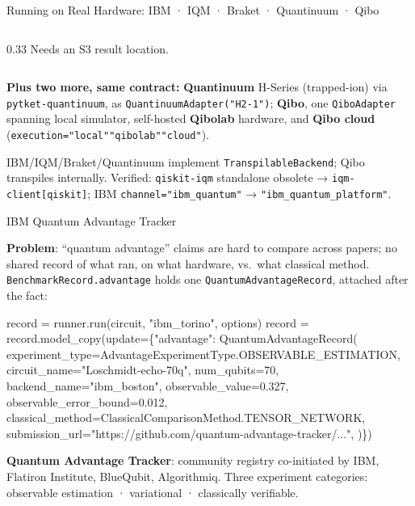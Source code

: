 \documentclass[
  ignorenonframetext,
  aspectratio=169,
]{beamer}
\newenvironment{Shaded}{\begin{snugshade}}{\end{snugshade}}
\newcommand{\DecValTok}[1]{\textcolor[rgb]{0.96,0.45,0.00}{#1}}
\newcommand{\FloatTok}[1]{\textcolor[rgb]{0.96,0.45,0.00}{#1}}
\newcommand{\NormalTok}[1]{\textcolor[rgb]{0.81,0.81,0.76}{#1}}
\newcommand{\OperatorTok}[1]{\textcolor[rgb]{0.81,0.81,0.76}{#1}}
\newcommand{\StringTok}[1]{\textcolor[rgb]{0.96,0.31,0.31}{#1}}
\begin{document}
\begin{frame}[fragile]{Running on Real Hardware: IBM · IQM · Braket ·
Quantinuum · Qibo}
\begin{columns}[T]
\begin{column}{0.33\textwidth}
Needs an S3 result location.
\end{column}
\end{columns}

\textbf{Plus two more, same contract:} \textbf{Quantinuum} H-Series
(trapped-ion) via \texttt{pytket-quantinuum}, as
\texttt{QuantinuumAdapter("H2-1")}; \textbf{Qibo}, one
\texttt{QiboAdapter} spanning local simulator, self-hosted
\textbf{Qibolab} hardware, and \textbf{Qibo cloud}
(\texttt{execution="local"\textbar{}"qibolab"\textbar{}"cloud"}).

IBM/IQM/Braket/Quantinuum implement \texttt{TranspilableBackend}; Qibo
transpiles internally. Verified: \texttt{qiskit-iqm} standalone obsolete
→ \texttt{iqm-client{[}qiskit{]}}; IBM \texttt{channel="ibm\_quantum"} →
\texttt{"ibm\_quantum\_platform"}. \normalsize
\end{frame}

\begin{frame}[fragile]{IBM Quantum Advantage Tracker}
\label{ibm-quantum-advantage-tracker}
\scriptsize

\textbf{Problem}: ``quantum advantage'' claims are hard to compare
across papers; no shared record of what ran, on what hardware, vs.~what
classical method. \texttt{BenchmarkRecord.advantage} holds one
\texttt{QuantumAdvantageRecord}, attached after the fact:

\begin{Shaded}
\begin{Highlighting}[]
\NormalTok{record }\OperatorTok{=}\NormalTok{ runner.run(circuit, }\StringTok{"ibm\_torino"}\NormalTok{, options)}
\NormalTok{record }\OperatorTok{=}\NormalTok{ record.model\_copy(update}\OperatorTok{=}\NormalTok{\{}\StringTok{"advantage"}\NormalTok{: QuantumAdvantageRecord(}
\NormalTok{    experiment\_type}\OperatorTok{=}\NormalTok{AdvantageExperimentType.OBSERVABLE\_ESTIMATION,}
\NormalTok{    circuit\_name}\OperatorTok{=}\StringTok{"Loschmidt{-}echo{-}70q"}\NormalTok{, num\_qubits}\OperatorTok{=}\DecValTok{70}\NormalTok{, backend\_name}\OperatorTok{=}\StringTok{"ibm\_boston"}\NormalTok{,}
\NormalTok{    observable\_value}\OperatorTok{=}\FloatTok{0.327}\NormalTok{, observable\_error\_bound}\OperatorTok{=}\FloatTok{0.012}\NormalTok{,}
\NormalTok{    classical\_method}\OperatorTok{=}\NormalTok{ClassicalComparisonMethod.TENSOR\_NETWORK,}
\NormalTok{    submission\_url}\OperatorTok{=}\StringTok{"https://github.com/quantum{-}advantage{-}tracker/..."}\NormalTok{,}
\NormalTok{)\})}
\end{Highlighting}
\end{Shaded}

\textbf{Quantum Advantage Tracker}: community registry co-initiated by
IBM, Flatiron Institute, BlueQubit, Algorithmiq. Three experiment
categories: observable estimation · variational · classically
verifiable. \normalsize
\end{frame}
\end{document}
